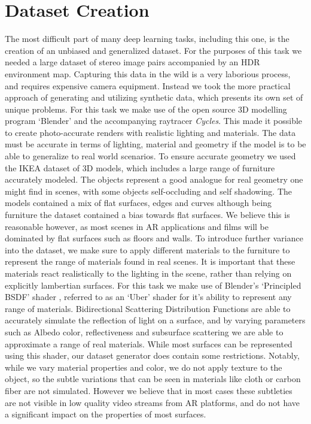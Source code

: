 \documentclass[ %
                    author={Gavin Parker},
                supervisor={Dr. Neill Campbell},
                    degree={MEng},
                     title={Deep Learning for Illumination Estimation from Stereo Images},
                  subtitle={},
                      type={Research},
                      year={2018} ]{dissertation}
\begin{document}
\section{Dataset Creation}
The most difficult part of many deep learning tasks, including this one, is the creation of an unbiased and generalized dataset. For the purposes of this task we needed a large dataset of stereo image pairs accompanied by an HDR environment map. Capturing this data in the wild is a very laborious process, and requires expensive camera equipment. Instead we took the more practical approach of generating and utilizing synthetic data, which presents its own set of unique problems. For this task we make use of the open source 3D modelling program `Blender' and the accompanying raytracer \textit{Cycles}. This made it possible to create photo-accurate renders with realistic lighting and materials. The data must be accurate in terms of lighting, material and geometry if the model is to be able to generalize to real world scenarios. To ensure accurate geometry we used the IKEA dataset \cite{lpt2013ikea} of 3D models, which includes a large range of furniture accurately modeled. The objects represent a good analogue for real geometry one might find in scenes, with some objects self-occluding and self shadowing. The models contained a mix of flat surfaces, edges and curves although being furniture the dataset contained a bias towards flat surfaces. We believe this is reasonable however, as most scenes in AR applications and films will be dominated by flat surfaces such as floors and walls.
\newline
To introduce further variance into the dataset, we make sure to apply different materials to the furniture to represent the range of materials found in real scenes. It is important that these materials react realistically to the lighting in the scene, rather than relying on explicitly lambertian surfaces. For this task we make use of Blender's `Principled BSDF' shader \cite{principled_BSDF}, referred to as an `Uber' shader for it's ability to represent any range of materials. Bidirectional Scattering Distribution Functions are able to accurately simulate the reflection of light on a surface, and by varying parameters such as Albedo color, reflectiveness and subsurface scattering we are able to approximate a range of real materials. While most surfaces can be represented using this shader, our dataset generator does contain some restrictions. Notably, while we vary material properties and color, we do not apply texture to the object, so the subtle variations that can be seen in materials like cloth or carbon fiber are not simulated. However we believe that in most cases these subtleties are not visible in low quality video streams from AR platforms, and do not have a significant impact on the properties of most surfaces.
\end{document}
